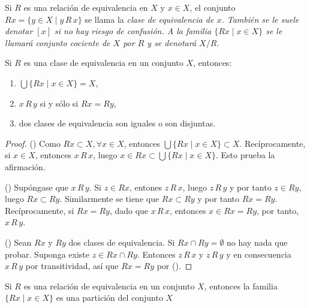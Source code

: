 
\begin{definition}
Si $R$ es una relación de equivalencia en $X$ y $x \in X$, el conjunto $R x = \{ y \in X \mid y \, R \, x \}$ se llama la \itshape{clase de equivalencia} de $x$. También se le suele denotar $[x]$ si no hay riesgo de confusión. A la familia $\{ R x \mid x \in X \}$ se le llamará \itshape{conjunto cociente} de $X$ por $R$ y se denotará $X/R$.
\end{definition}

\begin{theorem}
Si $R$ es una clase de equivalencia en un conjunto $X$, entonces:
\begin{enumerate}[label=\textnormal{(\roman*)}]
\item $\bigcup \{ R x \mid x \in X \} = X$,
\item $x \, R \, y$ si y sólo si $R x = R y$,
\item dos clases de equivalencia son iguales o son disjuntas.
\end{enumerate}
\end{theorem}

\begin{proof}
({}) Como $R x \subset X, \forall x \in X$, entonces $\bigcup \{ R x \mid x \in X \} \subset X$. Recíprocamente, si $x \in X$, entonces $x \, R \, x$, luego $x \in R x \subset \bigcup \{ R x \mid x \in X \}$. Esto prueba la afirmación.
\bigskip

({}) Supóngase que $x \, R \, y$. Si $z \in R x$, entones $z \, R \, x$, luego $z \, R \, y$ y por tanto $z \in R y$, luego $R x \subset R y$. Similarmente se tiene que $R x \subset R y$ y por tanto $R x = R y$. Recíprocamente, si $R x = R y$, dado que $x \, R \, x$, entonces $x \in R x = R y$, por tanto, $x \, R \, y$.
\bigskip

({}) Sean $R x$ y $R y$ dos clases de equivalencia. Si $R x \cap R y = \emptyset$ no hay nada que probar. Suponga existe $z \in R x \cap R y$. Entonces $z \, R \, x$ y $z \, R \, y$ y en consecuencia $x \, R \, y$ por transitividad, así que $R x = R y$ por ({}). \end{proof}

\begin{corollary}
Si $R$ es una relación de equivalencia en un conjunto $X$, entonces la familia $\{ R x \mid x \in X \}$ es una partición del conjunto $X$
\end{corollary}
